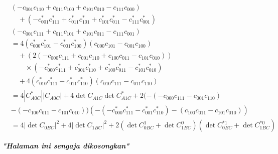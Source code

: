 \begin{equation}
\begin{aligned}
		&(-c_{001} c_{110}
		+ c_{011} c_{100}
		+ c_{101} c_{010}
		- c_{111} c_{000}) \\
		&\quad + (-c^{*}_{001} c^{*}_{111}
		+ c^{*}_{011} c^{*}_{101}
		+ c^{*}_{101} c^{*}_{011}
		- c^{*}_{111} c^{*}_{001})\\
		&(-c_{001} c_{111}
		+ c_{011} c_{101}
		+ c_{101} c_{011}
		- c_{111} c_{001})\\
		&= 4 (c^{*}_{000} c^{*}_{101}
		- c^{*}_{001} c^{*}_{100})
		(c_{000} c_{101}
		- c_{001} c_{100}) \\
		&\quad + (2 (-c_{000} c_{111}
		+ c_{001} c_{110}
		+ c_{100} c_{011}
		- c_{101} c_{010})) \\
		&\qquad \times
		(-c^{*}_{000} c^{*}_{111}
		+ c^{*}_{001} c^{*}_{110}
		+ c^{*}_{100} c^{*}_{011}
		- c^{*}_{101} c^{*}_{010}) \\
		&\quad + 4 (c^{*}_{010} c^{*}_{111}
		- c^{*}_{011} c^{*}_{110})
		(c_{010} c_{111}
		- c_{011} c_{110})\\
		&= 4 |C_{A0C}^{*}| |C_{A0C}|+ 4 \det C_{A1C} \det C_{A1C}^{*}+2(-(-c_{000}c_{111}-c_{001}c_{110})\\
		&-(-c_{100}c_{011}-c_{101}c_{010}))(-(-c^{*}_{000} c^{*}_{111}-c^{*}_{001} c^{*}_{110})-(c_{100}c_{011}-c_{101}c_{010}))\\
		&= 4 |\det C_{0BC}|^2
		+ 4 |\det C_{1BC}|^2
		+ 2 (\det C_{0BC}^1 + \det C_{1BC}^0)(\det C^{*1}_{0BC} + \det C^{*0}_{1BC})
	\end{aligned}
\end{equation}

\newpage
\thispagestyle{empty}
\begin{center}
	\vspace*{\fill}
	\textit{\textbf{"Halaman ini sengaja dikosongkan"}}
	\vspace*{\fill}
\end{center}
\pagebreak